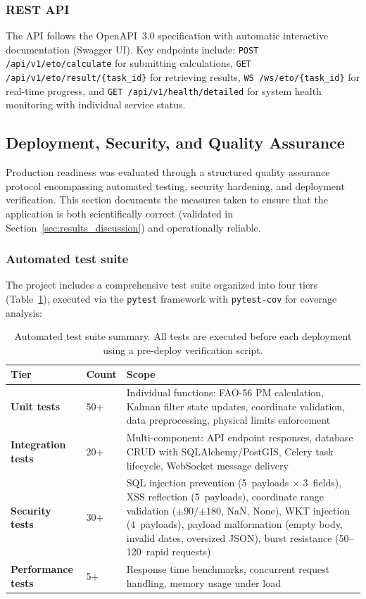 \documentclass[preprint,review,12pt]{elsarticle}
\begin{document}
\subsubsection*{REST API}

The API follows the OpenAPI~3.0 specification with automatic interactive
documentation (Swagger UI). Key endpoints include: \texttt{POST
/api/v1/eto/calculate} for submitting calculations, \texttt{GET
/api/v1/eto/result/\{task\_id\}} for retrieving results, \texttt{WS
/ws/eto/\{task\_id\}} for real-time progress, and \texttt{GET
/api/v1/health/detailed} for system health monitoring with individual service
status.

\subsection{Deployment, Security, and Quality Assurance}
\label{subsec:testing}

Production readiness was evaluated through a structured quality assurance
protocol encompassing automated testing, security hardening, and deployment
verification. This section documents the measures taken to ensure that the
application is both scientifically correct (validated in
Section~\ref{sec:results_discussion}) and operationally reliable.

\subsubsection*{Automated test suite}

The project includes a comprehensive test suite organized into four tiers
(Table~\ref{tab:tests}), executed via the \texttt{pytest} framework with
\texttt{pytest-cov} for coverage analysis:

\begin{table}[htbp]
\centering
\caption{Automated test suite summary. All tests are executed before each
deployment using a pre-deploy verification script.}
\label{tab:tests}
\small
\begin{tabular}{@{}llp{5.5cm}@{}}
\toprule
Tier & Count & Scope \\
\midrule
\textbf{Unit tests} & 50+ & Individual functions: FAO-56 PM
  calculation, Kalman filter state updates, coordinate validation,
  data preprocessing, physical limits enforcement \\
\textbf{Integration tests} & 20+ & Multi-component: API endpoint
  responses, database CRUD with SQLAlchemy/PostGIS, Celery task
  lifecycle, WebSocket message delivery \\
\textbf{Security tests} & 30+ & SQL injection prevention (5~payloads
  $\times$ 3~fields), XSS reflection (5~payloads), coordinate range
  validation ($\pm 90$/$\pm 180$, NaN, None), WKT injection
  (4~payloads), payload malformation (empty body, invalid dates,
  oversized JSON), burst resistance (50--120~rapid requests) \\
\textbf{Performance tests} & 5+ & Response time benchmarks,
  concurrent request handling, memory usage under load \\
\bottomrule
\end{tabular}
\end{table}
\end{document}
